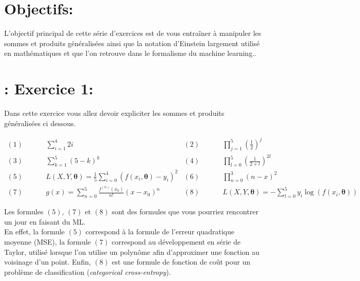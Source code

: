 \documentclass[11pt, french]{article}
\begin{document}
\section*{Objectifs:}
L'objectif principal de cette série d'exercices est de vous entraîner à manipuler les sommes et produits généralisées ainsi que la notation d'Einstein largement utilisé en mathématiques et que l'on retrouve dans le formalisme du machine learning..






\section*{: Exercice 1:}
Dans cette exercice vous allez devoir expliciter les sommes et produits généralisées ci dessous.

\begin{align*}
    (1)\hspace{1cm} & \sum_{i = 1}^{4}2i  & (2)\hspace{1cm} & \prod_{j=1}^{5} \left(\frac{1}{2}\right)^j \\
    (3)\hspace{1cm} & \sum_{k = 1}^{5} (5-k)^k & (4)\hspace{1cm} & \prod_{l=0}^{5}\left(\frac{1}{2+l}\right)^{2l} \\
    (5)\hspace{1cm} & L(X,Y,\mathbf{\theta}) = \frac{1}{5}\sum_{i=0}^{4}\left(f(x_i,\mathbf{\theta})-y_i\right)^2  & (6)\hspace{1cm} & \prod_{n=0}^{3}(n-x)^2  \\
    (7)\hspace{1cm} & g(x) = \sum_{n = 0}^{5} \frac{f^{(n)}(x_0)}{n!}(x-x_0)^n & (8)\hspace{1cm} & L(X,Y,\mathbf{\theta}) = -\sum_{l=0}^{5} y_i\log(f(x_i,\mathbf{\theta}))
\end{align*}

Les formules $(5)$, $(7)$ et $(8)$ sont des formules que vous pourriez rencontrer un jour en faisant du ML.\\
En effet, la formule $(5)$ correspond à la formule de l'erreur quadratique moyenne (MSE), la formule $(7)$ correspond au développement en série de Taylor, utilisé lorsque l'on utilise un polynôme afin d'approximer une fonction au voisinage d'un point. Enfin, $(8)$ est une formule de fonction de coût pour un problème de classification (\textit{categorical cross-entropy}).
\end{document}
